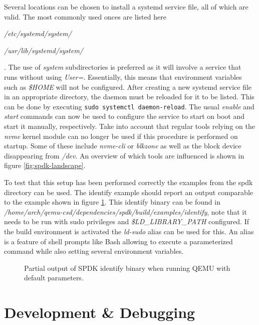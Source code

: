 \documentclass[conference]{IEEEtran}
\newcommand\bashstyle{
	\lstset{
		language=Bash,
		basicstyle=\ttm,
		showstringspaces=false,
		tabsize=2,
		aboveskip=0.2cm,
		belowskip=0.2cm,
		prebreak=\textbackslash,
		extendedchars=true,
		mathescape=false,
		linewidth=8.85cm,
		breaklines=true
	}
}
\newcommand\bashinline[1]{{\bashstyle\lstinline!#1!}}
\newcommand\bashexternal[2][]{{\bashstyle}}
\begin{document}
Several locations can be chosen to install a systemd service file, all of which
are valid. The most commonly used onces are listed here \begin{enumerate*}
\item \textit{/etc/systemd/system/} \item \textit{/usr/lib/systemd/system/}
\end{enumerate*}. The use of \textit{system} subdirectories is preferred as it
will involve a service that runs without using \textit{User=}. Essentially, this
means that environment variables such as \textit{\$HOME} will not be configured.
After creating a new systemd service file in an appropriate directory, the
daemon must be reloaded for it to be listed. This can be done by
executing\bashinline{sudo systemctl daemon-reload}. The usual \textit{enable}
and \textit{start} commands can now be used to configure the service to start
on boot and start it manually, respectively. Take into account that regular
tools relying on the \textit{nvme} kernel module can no longer be used if this
procedure is performed on startup. Some of these include \textit{nvme-cli} or
\textit{blkzone} as well as the block device disappearing from \textit{/dev}.
An overview of which tools are influenced is shown in figure
\ref{fig:spdk-landscape}.

To test that this setup has been performed correctly the examples from the spdk
directory can be used. The identify example should report an output comparable
to the example shown in figure \ref{fig:spdk-identify}. This identify binary can
be found in
\textit{/home/arch/qemu-csd/dependencies/spdk/build/examples/identify}, note
that it needs to be run with sudo privileges and \textit{\$LD\_LIBRARY\_PATH}
configured. If the build environment is activated the \textit{ld-sudo} alias can
be used for this. An alias is a feature of shell prompts like Bash allowing to
execute a parameterized command while also setting several environment
variables.

\begin{center}
	\begin{figure}[H]
		\bashexternal{resources/bash/identify-output.sh}
		\captionsetup{justification=centering}
		\caption{Partial output of SPDK identify binary when running QEMU with default
			parameters.}
		\label{fig:spdk-identify}
	\end{figure}
\end{center}

\section{Development \& Debugging} \label{development}
\end{document}
